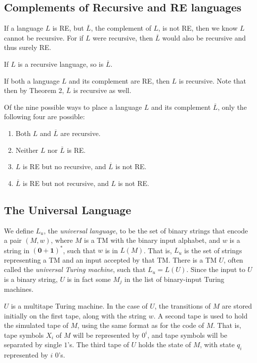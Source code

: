 \documentclass[]{article}
\begin{document}
\subsection*{Complements of Recursive and RE languages}
If a language $L$ is RE, but $\overline{L}$, the complement of $L$, is not RE,
then we know $L$ cannot be recursive. For if $L$ were recursive, then
$\overline{L}$ would also be recursive and thus surely RE.
\begin{thm}
If $L$ is a recursive language, so is $\overline{L}$.
\end{thm}
\begin{thm}
If both a language $L$ and its complement are RE, then $L$ is recursive. Note
that then by Theorem 2, $\overline{L}$ is recursive as well.
\end{thm}
Of the nine possible ways to place a language $L$ and its complement
$\overline{L}$, only the following four are possible:
\begin{enumerate}
\item Both $L$ and $\overline{L}$ are recursive.
\item Neither $L$ nor $\overline{L}$ is RE.
\item $L$ is RE but no recursive, and $\overline{L}$ is not RE.
\item $\overline{L}$ is RE but not recursive, and $L$ is not RE.
\end{enumerate}

\subsection*{The Universal Language}
We define $L_u$, the \emph{universal language}, to be the set of binary strings
that encode a pair $(M, w)$, where $M$ is a TM with the binary input alphabet,
and $w$ is a string in $(\bm{0} + \bm{1})^*$, such that $w$ is in $L(M)$. That
is, $L_u$ is the set of strings representing a TM and an input accepted by that
TM. There is a TM $U$, often called the \emph{universal Turing machine}, such
that $L_u = L(U)$. Since the input to $U$ is a binary string, $U$ is in fact
some $M_j$ in the list of binary-input Turing machines.

$U$ is a multitape Turing machine. In the case of $U$, the transitions of $M$
are stored initially on the first tape, along with the string $w$. A second tape
is used to hold the simulated tape of $M$, using the same format as for the code
of $M$. That is, tape symbols $X_i$ of $M$ will be represented by $0^i$, and
tape symbols will be separated by single $1$'s. The third tape of $U$ holds the
state of $M$, with state $q_i$ represented by $i$ $0$'s.
\end{document}
